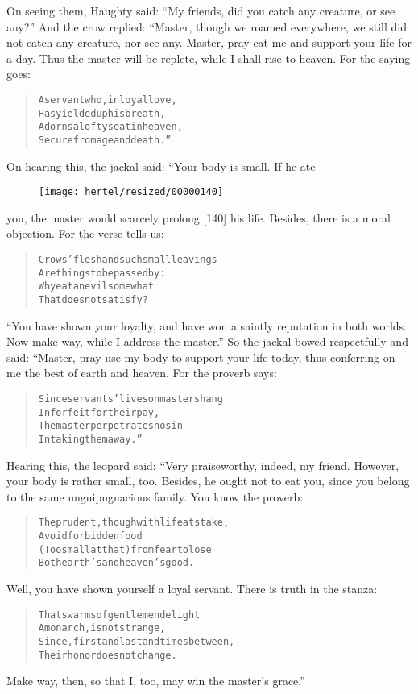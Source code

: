 \documentclass[article, twoside, 10pt]{memoir}
\renewenvironment{verbatim}{%
\begin{quote}%
\vskip -10pt%
\begin{alltt}\normalfont\small}{\end{alltt}%
\end{quote}%
\vskip -10pt
} %
\begin{document}
On seeing them, Haughty said:
``My friends, did you catch any creature, or see any?'' And the
crow replied: “Master, though we roamed everywhere, we still did
not catch any creature, nor see any. Master, pray eat me and
support your life for a day. Thus the master will be replete, while
I shall rise to heaven. For the saying goes:

\begin{verbatim}
A servant who, in loyal love,
Has yielded up his breath,
Adorns a lofty seat in heaven,
Secure from age and death.”
\end{verbatim}
On hearing this, the jackal said: “Your body is small. If he ate
\begin{figure}[p]\texttt{[image: hertel/resized/00000140]}\end{figure}you, the master would scarcely prolong [140] his life. Besides,
there is a moral objection. For the verse tells us:

\begin{verbatim}
Crows' flesh and such small leavings
    Are things to be passed by:
Why eat an evil somewhat
    That does not satisfy?
\end{verbatim}
``You have shown your loyalty, and have won a saintly reputation in both worlds. Now make way, while I address the master.''
So the jackal bowed respectfully and said: “Master, pray use my
body to support your life today, thus conferring on me the best of
earth and heaven. For the proverb says:

\begin{verbatim}
Since servants' lives on masters hang
    In forfeit for their pay,
The master perpetrates no sin
    In taking them away.”
\end{verbatim}
Hearing this, the leopard said: “Very praiseworthy, indeed, my
friend. However, your body is rather small, too. Besides, he ought
not to eat you, since you belong to the same unguipugnacious
family. You know the proverb:

\begin{verbatim}
The prudent, though with life at stake,
    Avoid forbidden food
(Too small at that){\textemdash}from fear to lose
    Both earth's and heaven's good.
\end{verbatim}
Well, you have shown yourself a loyal servant. There is truth in
the stanza:

\begin{verbatim}
That swarms of gentlemen delight
    A monarch, is not strange,
Since, first and last and times between,
    Their honor does not change.
\end{verbatim}
Make way, then, so that I, too, may win the master's grace.”
\end{document}
